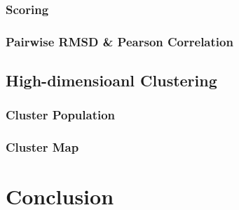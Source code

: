 \documentclass[a4paper]{article}
\begin{document}
\subsubsection{Scoring}

\subsubsection{Pairwise RMSD \& Pearson Correlation}

\subsection{High-dimensioanl Clustering}

\subsubsection{Cluster Population}

\subsubsection{Cluster Map}

\section{Conclusion}


\pagebreak


\end{document}
